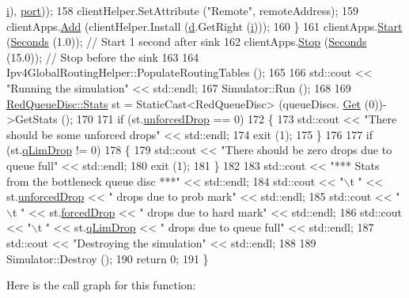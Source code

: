 \begin{DoxyCode}
      \hyperlink{bernuolliDistribution_8m_a6f6ccfcf58b31cb6412107d9d5281426}{i}), \hyperlink{dsdv-manet_8cc_a8e0798404bf2cf5dabb84c5ba9a4f236}{port}));
158       clientHelper.SetAttribute (\textcolor{stringliteral}{"Remote"}, remoteAddress);
159       clientApps.\hyperlink{classns3_1_1ApplicationContainer_ad09ab1a1ad5849d518d5f4c262e38152}{Add} (clientHelper.Install (\hyperlink{buildings__pathloss_8m_a9f9b934daed17a4d3613b6886ff4cf4b}{d}.GetRight (\hyperlink{bernuolliDistribution_8m_a6f6ccfcf58b31cb6412107d9d5281426}{i})));
160     \}
161   clientApps.\hyperlink{classns3_1_1ApplicationContainer_a8eff87926507020bbe3e1390358a54a7}{Start} (\hyperlink{group__timecivil_ga33c34b816f8ff6628e33d5c8e9713b9e}{Seconds} (1.0)); \textcolor{comment}{// Start 1 second after sink}
162   clientApps.\hyperlink{classns3_1_1ApplicationContainer_adfc52f9aa4020c8714679b00bbb9ddb3}{Stop} (\hyperlink{group__timecivil_ga33c34b816f8ff6628e33d5c8e9713b9e}{Seconds} (15.0)); \textcolor{comment}{// Stop before the sink}
163 
164   Ipv4GlobalRoutingHelper::PopulateRoutingTables ();
165 
166   std::cout << \textcolor{stringliteral}{"Running the simulation"} << std::endl;
167   Simulator::Run ();
168 
169   \hyperlink{structns3_1_1RedQueueDisc_1_1Stats}{RedQueueDisc::Stats} st = StaticCast<RedQueueDisc> (queueDiscs.
      \hyperlink{classns3_1_1QueueDiscContainer_a236064f6321b5f0d32561bb2a14e74af}{Get} (0))->GetStats ();
170 
171   \textcolor{keywordflow}{if} (st.\hyperlink{structns3_1_1RedQueueDisc_1_1Stats_a242027f6eb7d30e2cd636c52080e2c73}{unforcedDrop} == 0)
172     \{
173       std::cout << \textcolor{stringliteral}{"There should be some unforced drops"} << std::endl;
174       exit (1);
175     \}
176 
177   \textcolor{keywordflow}{if} (st.\hyperlink{structns3_1_1RedQueueDisc_1_1Stats_a2374b8b8386ad6e42435bf1b29109bad}{qLimDrop} != 0)
178     \{
179       std::cout << \textcolor{stringliteral}{"There should be zero drops due to queue full"} << std::endl;
180       exit (1);
181     \}
182 
183   std::cout << \textcolor{stringliteral}{"*** Stats from the bottleneck queue disc ***"} << std::endl;
184   std::cout << \textcolor{stringliteral}{"\(\backslash\)t "} << st.\hyperlink{structns3_1_1RedQueueDisc_1_1Stats_a242027f6eb7d30e2cd636c52080e2c73}{unforcedDrop} << \textcolor{stringliteral}{" drops due to prob mark"} << std::endl;
185   std::cout << \textcolor{stringliteral}{"\(\backslash\)t "} << st.\hyperlink{structns3_1_1RedQueueDisc_1_1Stats_a56951fa215564c8d2e59aa046dc3e494}{forcedDrop} << \textcolor{stringliteral}{" drops due to hard mark"} << std::endl;
186   std::cout << \textcolor{stringliteral}{"\(\backslash\)t "} << st.\hyperlink{structns3_1_1RedQueueDisc_1_1Stats_a2374b8b8386ad6e42435bf1b29109bad}{qLimDrop} << \textcolor{stringliteral}{" drops due to queue full"} << std::endl;
187   std::cout << \textcolor{stringliteral}{"Destroying the simulation"} << std::endl;
188 
189   Simulator::Destroy ();
190   \textcolor{keywordflow}{return} 0;
191 \}
\end{DoxyCode}


Here is the call graph for this function\+:


